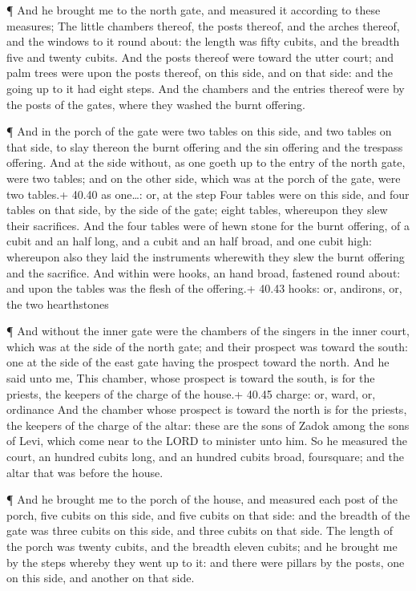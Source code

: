  ¶ And he brought me to the north gate, and measured it
according to these measures;  The little chambers thereof,
the posts thereof, and the arches thereof, and the windows to it round
about: the length was fifty cubits, and the breadth five and twenty
cubits.  And the posts thereof were toward the utter court;
and palm trees were upon the posts thereof, on this side, and on that
side: and the going up to it had eight steps.  And the
chambers and the entries thereof were by the posts of the gates, where
they washed the burnt offering.

 ¶ And in the porch of the gate were two tables on this
side, and two tables on that side, to slay thereon the burnt offering
and the sin offering and the trespass offering.  And at the
side without, as one goeth up to the entry of the north gate, were two
tables; and on the other side, which was at the porch of the gate, were
two tables.+ 40.40 as one\ldots: or, at the step  Four
tables were on this side, and four tables on that side, by the side of
the gate; eight tables, whereupon they slew their sacrifices.
 And the four tables were of hewn stone for the burnt
offering, of a cubit and an half long, and a cubit and an half broad,
and one cubit high: whereupon also they laid the instruments wherewith
they slew the burnt offering and the sacrifice.  And within
were hooks, an hand broad, fastened round about: and upon the tables was
the flesh of the offering.+ 40.43 hooks: or, andirons, or, the two
hearthstones

 ¶ And without the inner gate were the chambers of the
singers in the inner court, which was at the side of the north gate; and
their prospect was toward the south: one at the side of the east gate
having the prospect toward the north.  And he said unto me,
This chamber, whose prospect is toward the south, is for the priests,
the keepers of the charge of the house.+ 40.45 charge: or, ward, or,
ordinance  And the chamber whose prospect is toward the
north is for the priests, the keepers of the charge of the altar: these
are the sons of Zadok among the sons of Levi, which come near to the
LORD to minister unto him.  So he measured the court, an
hundred cubits long, and an hundred cubits broad, foursquare; and the
altar that was before the house.

 ¶ And he brought me to the porch of the house, and
measured each post of the porch, five cubits on this side, and five
cubits on that side: and the breadth of the gate was three cubits on
this side, and three cubits on that side.  The length of
the porch was twenty cubits, and the breadth eleven cubits; and he
brought me by the steps whereby they went up to it: and there were
pillars by the posts, one on this side, and another on that side.


